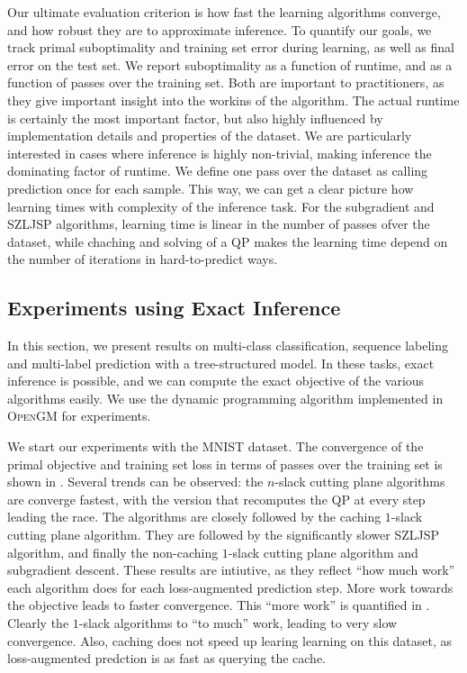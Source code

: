 Our ultimate evaluation criterion is how fast the learning algorithms converge,
and how robust they are to approximate inference.  To quantify our goals, we
track primal suboptimality and training set error during learning, as well as
final error on the test set.
We report suboptimality as a function of runtime, and as a function of passes
over the training set.  Both are important to practitioners, as they give
important insight into the workins of the algorithm.  The actual runtime is
certainly the most important factor, but also highly influenced by
implementation details and properties of the dataset. We are particularly
interested in cases where inference is highly non-trivial, making inference the
dominating factor of runtime.
We define one pass over the dataset as calling prediction once for each sample.
This way, we can get a clear picture how learning times with complexity of the
inference task. For the subgradient and SZLJSP algorithms, learning time is linear
in the number of passes ofver the dataset, while chaching and solving of a QP makes
the learning time depend on the number of iterations in hard-to-predict ways.

\subsection{Experiments using Exact Inference}
In this section, we present results on multi-class classification, sequence
labeling and multi-label prediction with a tree-structured model. In these
tasks, exact inference is possible, and we can compute the exact objective of
the various algorithms easily. We use the dynamic programming algorithm
implemented in \textsc{OpenGM} for experiments.

We start our experiments with the MNIST dataset.
The convergence of the primal objective and training set loss in terms of
passes over the training set is shown in .
Several trends can be observed: the $n$-slack cutting plane algorithms are converge fastest, with
the version that recomputes the QP at every step leading the race. The algorithms are
closely followed by the caching $1$-slack cutting plane algorithm.
They are followed by the significantly slower SZLJSP algorithm, and finally
the non-caching $1$-slack cutting plane algorithm and subgradient descent.
These results are intiutive, as they reflect ``how much work'' each algorithm does
for each loss-augmented prediction step. More work towards the objective leads to faster convergence.
This ``more work'' is quantified in .
Clearly the $1$-slack algorithms to ``to much'' work, leading to very slow
convergence.  Also, caching does not speed up learing learning on this dataset,
as loss-augmented predction is as fast as querying the cache.

